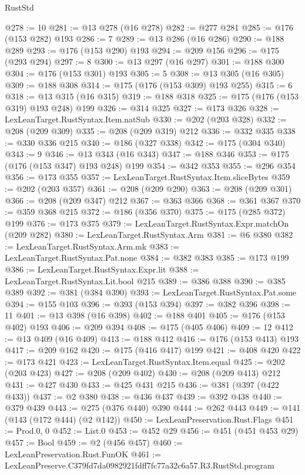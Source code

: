 \begin{lexlean}{RustStd}
\begin{coremodule}
@278 := 10
@281 := @13 @278 (@16 @278)
@282 := @277 @281
@285 := @176 (@153 @282) @193
@286 := 7
@289 := @13 @286 (@16 @286)
@290 := @188 @289
@293 := @176 (@153 @290) @193
@294 := @209 @156
@296 := @175 (@293 @294)
@297 := 8
@300 := @13 @297 (@16 @297)
@301 := @188 @300
@304 := @176 (@153 @301) @193
@305 := 5
@308 := @13 @305 (@16 @305)
@309 := @188 @308
@314 := @175 (@176 (@153 @309) @193 @255)
@315 := 6
@318 := @13 @315 (@16 @315)
@319 := @188 @318
@325 := @175 (@176 (@153 @319) @193 @248) @199
@326 := @314 @325
@327 := @173 @326
@328 := LexLeanTarget.RustSyntax.Item.natSub
@330 := @202 (@203 @328)
@332 := @208 (@209 @309)
@335 := @208 (@209 @319) @212
@336 := @332 @335
@338 := @330 @336 @215
@340 := @186 (@327 @338)
@342 := @175 (@304 @340)
@343 := 9
@346 := @13 @343 (@16 @343)
@347 := @188 @346
@353 := @175 (@176 (@153 @347) @193 @248) @199
@354 := @342 @353
@355 := @296 @354
@356 := @173 @355
@357 := LexLeanTarget.RustSyntax.Item.sliceBytes
@359 := @202 (@203 @357)
@361 := @208 (@209 @290)
@363 := @208 (@209 @301)
@366 := @208 (@209 @347) @212
@367 := @363 @366
@368 := @361 @367
@370 := @359 @368 @215
@372 := @186 (@356 @370)
@375 := @175 (@285 @372) @199
@376 := @173 @375
@379 := LexLeanTarget.RustSyntax.Expr.matchOn (@209 @282)
@380 := LexLeanTarget.RustSyntax.Arm
@381 := @6 @380
@382 := LexLeanTarget.RustSyntax.Arm.mk
@383 := LexLeanTarget.RustSyntax.Pat.none
@384 := @382 @383
@385 := @173 @199
@386 := LexLeanTarget.RustSyntax.Expr.lit
@388 := LexLeanTarget.RustSyntax.Lit.bool @215
@389 := @386 @388
@390 := @385 @389
@392 := @381 (@384 @390)
@393 := LexLeanTarget.RustSyntax.Pat.some
@394 := @155 @103
@396 := @393 (@153 @394)
@397 := @382 @396
@398 := 11
@401 := @13 @398 (@16 @398)
@402 := @188 @401
@405 := @176 (@153 @402) @193
@406 := @209 @394
@408 := @175 (@405 @406)
@409 := 12
@412 := @13 @409 (@16 @409)
@413 := @188 @412
@416 := @176 (@153 @413) @193
@417 := @209 @162
@420 := @175 (@416 @417) @199
@421 := @408 @420
@422 := @173 @421
@423 := LexLeanTarget.RustSyntax.Item.equal
@425 := @202 (@203 @423)
@427 := @208 (@209 @402)
@430 := @208 (@209 @413) @212
@431 := @427 @430
@433 := @425 @431 @215
@436 := @381 (@397 (@422 @433))
@437 := @2 @380
@438 := @436 @437
@439 := @392 @438
@440 := @379 @439
@443 := @275 (@376 @440) @390
@444 := @262 @443
@449 := @141 (@143 (@172 @444) (@2 @142))
@450 := LexLeanPreservation.Rust.Flags
@451 := Prod.{0, 0}
@452 := List.{0}
@453 := @452 @29
@456 := @451 (@451 @453 @29)
@457 := Bool
@459 := @2 (@456 @457)
@460 := LexLeanPreservation.Rust.FunOK
@461 := LexLeanPreserve.C379fd7da0982921fdff7fc77a32c6a57.R3.RustStd.program

\end{coremodule}
\end{lexlean}
